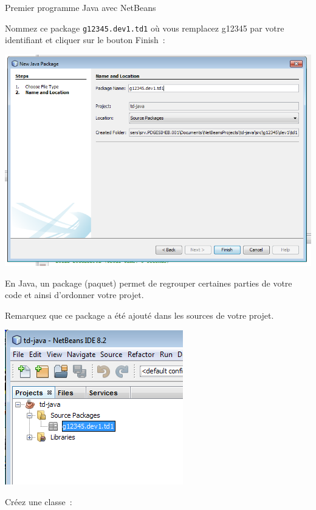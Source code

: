 \documentclass[a4paper,11pt]{article}
\begin{document}
\begin{Tutoriel}{Premier programme Java avec NetBeans}
\begin{steps}
			Nommez ce package \texttt{g12345.dev1.td1} où vous remplacez g12345 par votre identifiant et cliquer sur le bouton \og Finish\fg~:
			
			\bigskip
			\begin{center}
				\includegraphics[width=\textwidth]{images/nb_newproject_package2}
			\end{center}
			
			En Java, un package (paquet) permet de regrouper certaines parties de votre code
			et ainsi d'ordonner votre projet.

			Remarquez que ce package a été ajouté dans les sources de votre projet. 
			\bigskip
			\begin{center}
				\includegraphics{images/nb_newproject_package3}
			\end{center}
			


		\item Créez une classe~:
		

\end{steps}
\end{Tutoriel}
\end{document}
